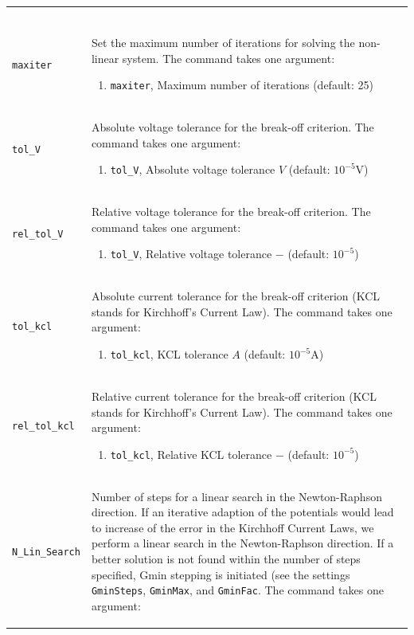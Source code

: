 \documentclass[noshowpacs,preprintnumbers,amsmath,amssymb, letter]{revtex4}
\begin{document}
\begin{longtable}{p{}p{}}
\begin{enumerate}
\end{enumerate}\\
\texttt{maxiter}	&  Set the maximum number of iterations for solving the non-linear system. The command takes one argument:
\begin{enumerate}
\item \texttt{maxiter}, Maximum number of iterations (default: 25)
\end{enumerate}\\
\texttt{tol\_V}	&  Absolute voltage tolerance for the break-off criterion. The command takes one argument:
\begin{enumerate}
\item \texttt{tol\_V}, Absolute voltage tolerance $V$ (default: $10^{-5} \text{V}$)
\end{enumerate}\\
\texttt{rel\_tol\_V}	&  Relative voltage tolerance for the break-off criterion. The command takes one argument:
\begin{enumerate}
\item \texttt{tol\_V}, Relative voltage tolerance $-$ (default: $10^{-5}$)
\end{enumerate}\\
\texttt{tol\_kcl}	&  Absolute current tolerance for the break-off criterion (KCL stands for Kirchhoff's Current Law). The command takes one argument:
\begin{enumerate}
\item \texttt{tol\_kcl}, KCL tolerance $A$ (default: $10^{-5} \text{A}$)
\end{enumerate}\\
\texttt{rel\_tol\_kcl}	&  Relative current tolerance for the break-off criterion (KCL stands for Kirchhoff's Current Law). The command takes one argument:
\begin{enumerate}
\item \texttt{tol\_kcl}, Relative KCL tolerance $-$ (default: $10^{-5}$)
\end{enumerate}\\
\texttt{N\_Lin\_Search}	&  Number of steps for a linear search in the Newton-Raphson direction. If an iterative adaption of the potentials would lead to increase of the error in the Kirchhoff Current Laws, we perform a linear search in the Newton-Raphson direction. If a better solution is not found within the number of steps specified, Gmin stepping is initiated (see the settings \texttt{GminSteps}, \texttt{GminMax}, and \texttt{GminFac}. The command takes one argument:
\begin{enumerate}

\end{enumerate}
\end{longtable}
\end{document}
